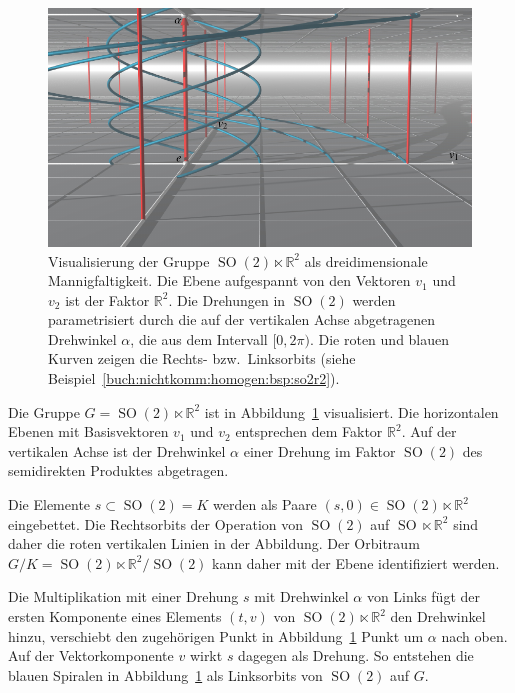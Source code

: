 \begin{beispiel}
\label{buch:nichtkomm:homogen:bsp:so2r2}
\begin{figure}
\centering
\includegraphics{chapters/070-nichtkomm/images/so2r2.pdf}
\caption{Visualisierung der Gruppe $\operatorname{SO}(2)\ltimes \mathbb{R}^2$
als dreidimensionale Mannigfaltigkeit.
Die Ebene aufgespannt von den Vektoren $v_1$ und $v_2$ ist der Faktor
$\mathbb{R}^2$.
Die Drehungen in $\operatorname{SO}(2)$ werden parametrisiert durch
die auf der vertikalen Achse abgetragenen Drehwinkel $\alpha$, die 
aus dem Intervall $[0,2\pi)$.
Die roten und blauen Kurven zeigen die Rechts- bzw.~Linksorbits
(siehe Beispiel~\ref{buch:nichtkomm:homogen:bsp:so2r2}).
\label{buch:nichtkomm:homogen:fig:so2r2}}
\end{figure}
Die Gruppe $G=\operatorname{SO}(2)\ltimes \mathbb{R}^2$ ist in 
Abbildung~\ref{buch:nichtkomm:homogen:fig:so2r2} visualisiert.
Die horizontalen Ebenen mit Basisvektoren $v_1$ und $v_2$ 
entsprechen dem Faktor $\mathbb{R}^2$.
Auf der vertikalen Achse ist der Drehwinkel $\alpha$ einer Drehung
im Faktor $\operatorname{SO}(2)$ des semidirekten Produktes abgetragen.

Die Elemente $s\subset \operatorname{SO}(2)=K$ werden als Paare
$(s,0)\in \operatorname{SO}(2)\ltimes\mathbb{R}^2$ eingebettet.
Die Rechtsorbits der Operation von $\operatorname{SO}(2)$ auf
$\operatorname{SO}\ltimes \mathbb{R}^2$ sind daher die roten vertikalen
Linien in der Abbildung.
Der Orbitraum
$G/K
=
\operatorname{SO}(2)\ltimes\mathbb{R}^2/\operatorname{SO}(2)$
kann daher mit der Ebene identifiziert werden.

Die Multiplikation mit einer Drehung $s$ mit Drehwinkel $\alpha$ von
Links fügt der ersten Komponente eines Elements $(t,v)$ von
$\operatorname{SO}(2)\ltimes\mathbb{R}^2$ den Drehwinkel hinzu, 
verschiebt den zugehörigen Punkt in
Abbildung~\ref{buch:nichtkomm:homogen:fig:so2r2}
Punkt um $\alpha$ nach oben.
Auf der Vektorkomponente $v$ wirkt $s$ dagegen als Drehung.
So entstehen die blauen Spiralen in
Abbildung~\ref{buch:nichtkomm:homogen:fig:so2r2}
als
Linksorbits von $\operatorname{SO}(2)$ auf $G$.
\end{beispiel}


